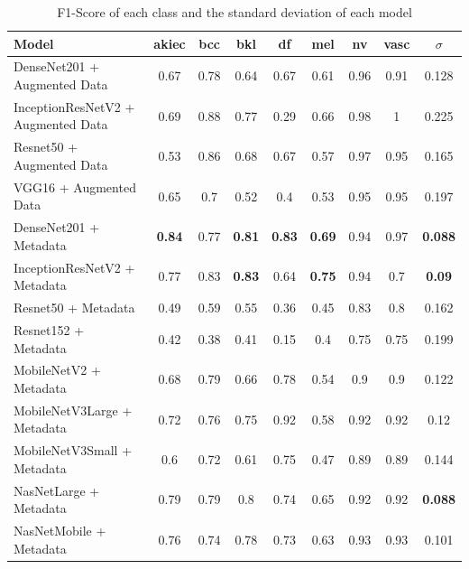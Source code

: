 \FloatBarrier
\begin{table}[h]
	\centering
	\begin{tabular}{|l | c | c | c | c | c | c | c | c|} 
		\hline
		Model & akiec & bcc & bkl & df & mel & nv & vasc & $\sigma$ \\
		\hline
		DenseNet201 + Augmented Data & 0.67 & 0.78 & 0.64 & 0.67 & 0.61 & 0.96 & 0.91 & 0.128 \\ 
		\hline
		InceptionResNetV2 + Augmented Data & 0.69 &	0.88 & 0.77 & 0.29 & 0.66 & 0.98 & 1 & 0.225\\
		\hline
		Resnet50 + Augmented Data & 0.53 & 0.86 & 0.68 & 0.67 & 0.57 & 0.97 & 0.95 & 0.165\\
		\hline 	
		VGG16 + Augmented Data & 0.65 & 0.7 & 0.52 & 0.4 & 0.53 & 0.95 & 0.95 & 0.197\\ 
		\hline		
		DenseNet201 + Metadata & \textbf{0.84} & 0.77 & \textbf{0.81} & \textbf{0.83} & \textbf{0.69} & 0.94 & 0.97 & \textbf{0.088}\\
		\hline
		InceptionResNetV2 + Metadata & 0.77 & 0.83 & \textbf{0.83} & 0.64 & \textbf{0.75} & 0.94 & 0.7 & \textbf{0.09}\\
		\hline
		Resnet50 + Metadata & 0.49 & 0.59 & 0.55 & 0.36 & 0.45 & 0.83 & 0.8 & 0.162\\
		\hline
		Resnet152 + Metadata & 0.42 & 0.38 & 0.41 & 0.15 & 0.4 & 0.75 & 0.75 & 0.199\\
		\hline
		MobileNetV2 + Metadata & 0.68 & 0.79 & 0.66 & 0.78 & 0.54 & 0.9 & 0.9 & 0.122\\
		\hline
		MobileNetV3Large + Metadata & 0.72 & 0.76 & 0.75 & 0.92 & 0.58 & 0.92 & 0.92 & 0.12\\
		\hline
		MobileNetV3Small + Metadata & 0.6 & 0.72 & 0.61 & 0.75 & 0.47 & 0.89 & 0.89 & 0.144\\
		\hline
		NasNetLarge + Metadata & 0.79 & 0.79 & 0.8 & 0.74 & 0.65 & 0.92 & 0.92 & \textbf{0.088}\\
		\hline
		NasNetMobile + Metadata & 0.76 & 0.74 & 0.78 & 0.73 & 0.63 & 0.93 & 0.93 & 0.101\\
		\hline
	\end{tabular}
	\caption{F1-Score of each class and the standard deviation of each model}
	\label{table:5}
\end{table}
\FloatBarrier
\FloatBarrier
